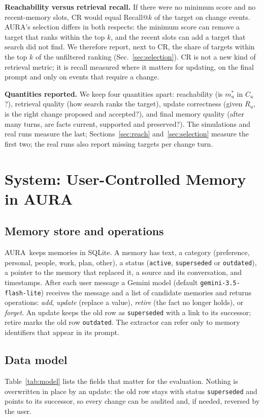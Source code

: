 \IfFileExists{IEEEtran.cls}{\documentclass[journal]{IEEEtran}\def\HAVEIEEE{1}}{\documentclass[10pt,twocolumn]{article}\usepackage[margin=0.7in,columnsep=0.25in]{geometry}}
\newcommand{\aura}{AURA}
\begin{document}
\textbf{Reachability versus retrieval recall.} If there were no minimum score and no recent-memory slots, CR would equal Recall@$k$ of the target on change events. \aura's selection differs in both respects: the minimum score can remove a target that ranks within the top $k$, and the recent slots can add a target that search did not find. We therefore report, next to CR, the share of targets within the top $k$ of the unfiltered ranking (Sec.~\ref{sec:selection}). CR is not a new kind of retrieval metric; it is recall measured where it matters for updating, on the final prompt and only on events that require a change.

\textbf{Quantities reported.} We keep four quantities apart: reachability (is $m^*_u$ in $C_u$?), retrieval quality (how search ranks the target), update correctness (given $R_u$, is the right change proposed and accepted?), and final memory quality (after many turns, are facts current, supported and preserved?). The simulations and real runs measure the last; Sections~\ref{sec:reach} and~\ref{sec:selection} measure the first two; the real runs also report missing targets per change turn.

\section{System: User-Controlled Memory in \aura}
\label{sec:system}
\subsection{Memory store and operations}
\aura\ keeps memories in SQLite. A memory has text, a category (preference, personal, people, work, plan, other), a status (\texttt{active}, \texttt{superseded} or \texttt{outdated}), a pointer to the memory that replaced it, a source and its conversation, and timestamps. After each user message a Gemini model (default \texttt{gemini-3.5-flash-lite}) receives the message and a list of candidate memories and returns operations: \emph{add}, \emph{update} (replace a value), \emph{retire} (the fact no longer holds), or \emph{forget}. An update keeps the old row as \texttt{superseded} with a link to its successor; retire marks the old row \texttt{outdated}. The extractor can refer only to memory identifiers that appear in its prompt.

\subsection{Data model}
Table~\ref{tab:model} lists the fields that matter for the evaluation. Nothing is overwritten in place by an update: the old row stays with status \texttt{superseded} and points to its successor, so every change can be audited and, if needed, reversed by the user.
\end{document}
